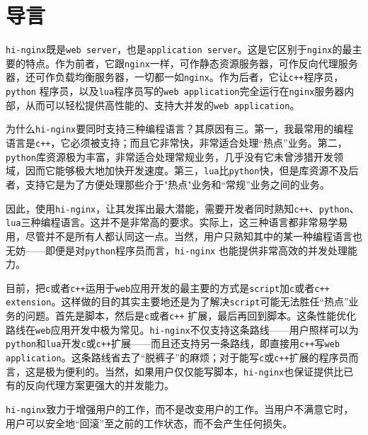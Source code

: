 \section{导言}
\texttt{hi-nginx}既是\texttt{web server}，也是\texttt{application server}。这是它区别于\texttt{nginx}的最主要的特点。作为前者，它跟\texttt{nginx}一样，可作静态资源服务器，可作反向代理服务器，还可作负载均衡服务器，一切都一如\texttt{nginx}。作为后者，它让\texttt{c++}程序员，\texttt{python} 程序员，以及\texttt{lua}程序员写的\texttt{web application}完全运行在\texttt{nginx}服务器内部，从而可以轻松提供高性能的、支持大并发的\texttt{web application}。

为什么\texttt{hi-nginx}要同时支持三种编程语言？其原因有三。第一，我最常用的编程语言是\texttt{c++}，它必须被支持；而且它非常快，非常适合处理“热点”业务。第二，\texttt{python}库资源极为丰富，非常适合处理常规业务，几乎没有它未曾涉猎开发领域，因而它能够极大地加快开发速度。第三，\texttt{lua}比\texttt{python}快，但是库资源不及后者，支持它是为了方便处理那些介于"热点"业务和“常规”业务之间的业务。

因此，使用\texttt{hi-nginx}，让其发挥出最大潜能，需要开发者同时熟知\texttt{c++}、\texttt{python}、\texttt{lua}三种编程语言。这并不是非常高的要求。实际上，这三种语言都非常易学易用，尽管并不是所有人都认同这一点。当然，用户只熟知其中的某一种编程语言也无妨——即便是对\texttt{python}程序员而言，\texttt{hi-nginx}	也能提供非常高效的并发处理能力。

目前，把\texttt{c}或者\texttt{c++}运用于\texttt{web}应用开发的最主要的方式是\texttt{script}加\texttt{c}或者\texttt{c++} \texttt{extension}。这样做的目的其实主要地还是为了解决\texttt{script}可能无法胜任“热点”业务的问题。首先是脚本，然后是\texttt{c}或者\texttt{c++} 扩展，最后再回到脚本。这条性能优化路线在\texttt{web}应用开发中极为常见。\texttt{hi-nginx}不仅支持这条路线——用户照样可以为\texttt{python}和\texttt{lua}开发\texttt{c}或\texttt{c++}扩展——而且还支持另一条路线，即直接用\texttt{c++}写\texttt{web application}。这条路线省去了“脱裤子”的麻烦；对于能写\texttt{c}或\texttt{c++}扩展的程序员而言，这是极为便利的。当然，如果用户仅仅能写脚本，\texttt{hi-nginx}也保证提供比已有的反向代理方案更强大的并发能力。

\texttt{hi-nginx}致力于增强用户的工作，而不是改变用户的工作。当用户不满意它时，用户可以安全地“回滚”至之前的工作状态，而不会产生任何损失。